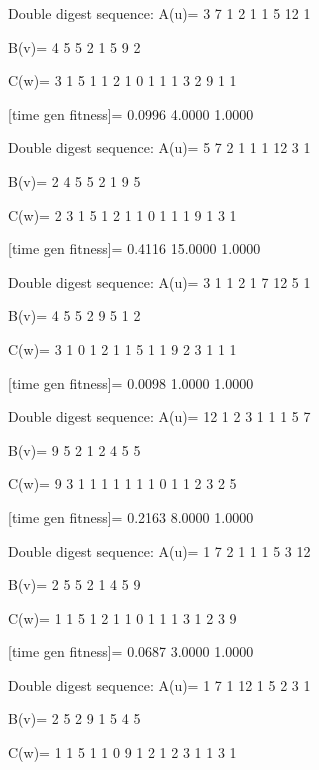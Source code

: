 Double digest sequence:
A(u)=
     3     7     1     2     1     1     5    12     1

B(v)=
     4     5     5     2     1     5     9     2

C(w)=
     3     1     5     1     1     2     1     0     1     1     1     3     2     9     1     1

[time gen fitness]=
    0.0996    4.0000    1.0000

Double digest sequence:
A(u)=
     5     7     2     1     1     1    12     3     1

B(v)=
     2     4     5     5     2     1     9     5

C(w)=
     2     3     1     5     1     2     1     1     0     1     1     1     9     1     3     1

[time gen fitness]=
    0.4116   15.0000    1.0000

Double digest sequence:
A(u)=
     3     1     1     2     1     7    12     5     1

B(v)=
     4     5     5     2     9     5     1     2

C(w)=
     3     1     0     1     2     1     1     5     1     1     9     2     3     1     1     1

[time gen fitness]=
    0.0098    1.0000    1.0000

Double digest sequence:
A(u)=
    12     1     2     3     1     1     1     5     7

B(v)=
     9     5     2     1     2     4     5     5

C(w)=
     9     3     1     1     1     1     1     1     1     0     1     1     2     3     2     5

[time gen fitness]=
    0.2163    8.0000    1.0000

Double digest sequence:
A(u)=
     1     7     2     1     1     1     5     3    12

B(v)=
     2     5     5     2     1     4     5     9

C(w)=
     1     1     5     1     2     1     1     0     1     1     1     3     1     2     3     9

[time gen fitness]=
    0.0687    3.0000    1.0000

Double digest sequence:
A(u)=
     1     7     1    12     1     5     2     3     1

B(v)=
     2     5     2     9     1     5     4     5

C(w)=
     1     1     5     1     1     0     9     1     2     1     2     3     1     1     3     1

